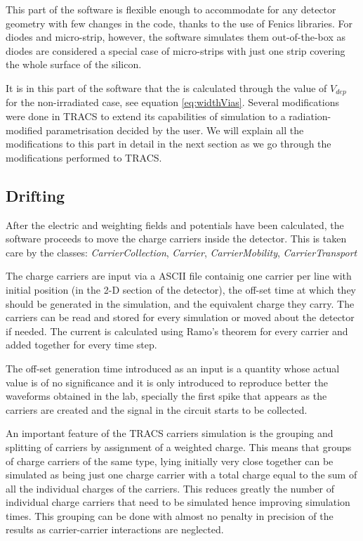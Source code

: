 This part of the software is flexible enough to accommodate for any detector geometry with few changes in the code, thanks to the use of Fenics libraries. For diodes and micro-strip, however, the software simulates them out-of-the-box as diodes are considered a special case of micro-strips with just one strip covering the whole surface of the silicon.

It is in this part of the software that the \neff is calculated through the value of $V_{dep}$ for the non-irradiated case, see equation \ref{eq:widthVias}. Several modifications were done in TRACS to extend its capabilities of simulation to a radiation-modified \neff parametrisation decided by the user. We will explain all the modifications to this part in detail in the next section as we go through the modifications performed to TRACS.


\subsection{Drifting}

After the electric and weighting fields and potentials have been calculated, the software proceeds to move the charge carriers inside the detector. This is taken care by the classes: \textit{CarrierCollection}, \textit{Carrier}, \textit{CarrierMobility}, \textit{CarrierTransport}

The charge carriers are input via a ASCII file containig one carrier per line with initial position (in the 2-D section of the detector), the off-set time at which they should be generated in the simulation, and the equivalent charge they carry. The carriers can be read and stored for every simulation or moved about the detector if needed. The current is calculated using Ramo's theorem for every carrier and added together for every time step.

The off-set generation time introduced as an input is a quantity whose actual value is of no significance and it is only introduced to reproduce better the waveforms obtained in the lab, specially the first spike that appears as the carriers are created and the signal in the circuit starts to be collected. 

An important feature of the TRACS carriers simulation is the grouping and splitting of carriers by assignment of a weighted charge. This means that groups of charge carriers  of the same type, lying initially very close together can be simulated as being just one charge carrier with a total charge equal to the sum of all the individual charges of the carriers. This reduces greatly the number of individual charge carriers that need to be simulated hence improving simulation times. This grouping can be done with almost no penalty in precision of the results as carrier-carrier interactions are neglected.

